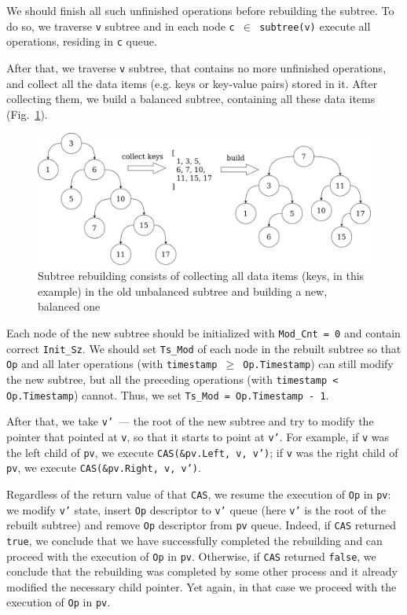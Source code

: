 \documentclass[times, dvipsnames,%
               languages={russian,english} %
              ]{itmo-student-thesis}
\begin{document}
We should finish all such unfinished operations before rebuilding the subtree. To do so, we traverse \texttt{v} subtree and in each node \texttt{c $\in$ subtree(v)} execute all operations, residing in \texttt{c} queue.

After that, we traverse \texttt{v} subtree, that contains no more unfinished operations, and collect all the data items (e.g. keys or key-value pairs) stored in it. After collecting them, we build a balanced subtree, containing all these data items (Fig.~\ref{collect-build-ideal-pic}).

\begin{figure}[H]
  \centering
  \caption{Subtree rebuilding consists of collecting all data items (keys, in this example) in the old unbalanced subtree and building a new, balanced one}
  \label{collect-build-ideal-pic}
  \includegraphics[width=\linewidth]{pics/collect-build-ideal.png}
\end{figure}

Each node of the new subtree should be initialized with \texttt{Mod\_Cnt = 0} and contain correct \texttt{Init\_Sz}. We should set \texttt{Ts\_Mod} of each node in the rebuilt subtree so that \texttt{Op} and all later operations (with \texttt{timestamp $\geq$ Op.Timestamp}) can still modify the new subtree, but all the preceding operations (with \texttt{timestamp < Op.Timestamp}) cannot. Thus, we set \texttt{Ts\_Mod = Op.Timestamp - 1}.

After that, we take \texttt{v'}~--- the root of the new subtree and try to modify the pointer that pointed at \texttt{v}, so that it starts to point at \texttt{v'}. For example, if \texttt{v} was the left child of \texttt{pv}, we execute \texttt{CAS(\&pv.Left, v, v')}; if \texttt{v} was the right child of \texttt{pv}, we execute \texttt{CAS(\&pv.Right, v, v')}. 

Regardless of the return value of that \texttt{CAS}, we resume the execution of \texttt{Op} in \texttt{pv}: we modify \texttt{v'} state, insert \texttt{Op} descriptor to \texttt{v'} queue (here \texttt{v'} is the root of the rebuilt subtree) and remove \texttt{Op} descriptor from \texttt{pv} queue. Indeed, if \texttt{CAS} returned \texttt{true}, we conclude that we have successfully completed the rebuilding and can proceed with the execution of \texttt{Op} in \texttt{pv}. Otherwise, if \texttt{CAS} returned \texttt{false}, we conclude that the rebuilding was completed by some other process and it already modified the necessary child pointer. Yet again, in that case we proceed with the execution of \texttt{Op} in \texttt{pv}.
\end{document}
